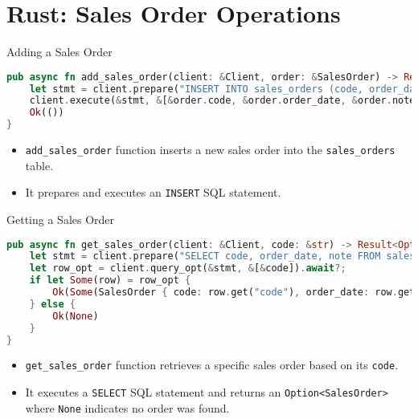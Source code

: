 \documentclass[aspectratio=169, table]{beamer}
\begin{document}
\section{Rust: Sales Order Operations}
\begin{frame}[fragile]{Adding a Sales Order}
\begin{lstlisting}[language=Rust]
pub async fn add_sales_order(client: &Client, order: &SalesOrder) -> Result<(), Error> {
	let stmt = client.prepare("INSERT INTO sales_orders (code, order_date, note) VALUES ($1, $2, $3)").await?;
	client.execute(&stmt, &[&order.code, &order.order_date, &order.note]).await?;
	Ok(())
}
\end{lstlisting}

\begin{itemize}
\item \texttt{add\_sales\_order} function inserts a new sales order into the \texttt{sales\_orders} table.
\item It prepares and executes an \texttt{INSERT} SQL statement.
\end{itemize}
\end{frame}


\begin{frame}[fragile]{Getting a Sales Order}
\vspace{15pt}
\begin{lstlisting}[language=Rust]
pub async fn get_sales_order(client: &Client, code: &str) -> Result<Option<SalesOrder>, Error> {
	let stmt = client.prepare("SELECT code, order_date, note FROM sales_orders WHERE code = $1").await?;
	let row_opt = client.query_opt(&stmt, &[&code]).await?;
	if let Some(row) = row_opt {
		Ok(Some(SalesOrder { code: row.get("code"), order_date: row.get("order_date"), note: row.get("note") }))
	} else {
		Ok(None)
	}
}
\end{lstlisting}

\begin{itemize}
\item \texttt{get\_sales\_order} function retrieves a specific sales order based on its \texttt{code}.
\item It executes a \texttt{SELECT} SQL statement and returns an \texttt{Option<SalesOrder>} where \texttt{None} indicates no order was found.
\end{itemize}
\end{frame}
\end{document}
